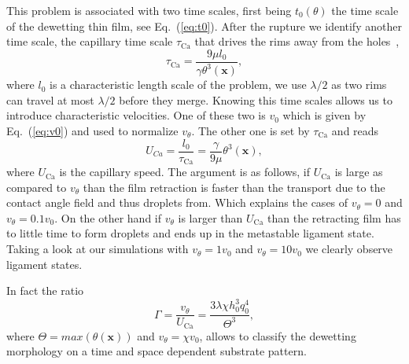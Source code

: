 \documentclass[twocolumn,amsmath,amssymb,showpacs,pre,nofootinbib,superscriptaddress]{revtex4-1} %
\begin{document}
This problem is associated with two time scales, first being $t_0(\theta)$ the time scale of the dewetting thin film, see Eq.~(\ref{eq:t0}).
After the rupture we identify another time scale, the capillary time scale $\tau_{\text{Ca}}$ that drives the rims away from the holes~\cite{Edwardse1600183},
\begin{equation}\label{eq:cap_time}
    \tau_{\text{Ca}} = \frac{9\mu l_0}{\gamma \theta^3(\mathbf{x})},
\end{equation}
where  $l_0$ is a characteristic length scale of the problem, we use $\lambda/2$ as two rims can travel at most $\lambda/2$ before they merge.
Knowing this time scales allows us to introduce characteristic velocities.
One of these two is $v_0$ which is given by Eq.~(\ref{eq:v0}) and used to normalize $v_{\theta}$.
The other one is set by $\tau_{\text{Ca}}$ and reads
\begin{equation}\label{eq:cap_speed}
    U_{Ca} =\frac{l_0}{\tau_{\text{Ca}}} = \frac{\gamma}{9\mu} \theta^3(\mathbf{x}), 
\end{equation}
where $U_{\text{Ca}}$ is the capillary speed.
The argument is as follows, if $U_{\text{Ca}}$ is large as compared to $v_{\theta}$ than the film retraction is faster than the transport due to the contact angle field and thus droplets from.
Which explains the cases of $v_{\theta} = 0$ and  $v_{\theta} = 0.1v_0$.
On the other hand if $v_{\theta}$ is larger than $U_{\text{Ca}}$ than the retracting film has to little time to form droplets and ends up in the metastable ligament state.
Taking a look at our simulations with $v_{\theta} = 1v_0$ and $v_{\theta} =  10v_0$ we clearly observe ligament states.

In fact the ratio 
\begin{equation}\label{eq:vel_ratio}
    \Gamma = \frac{v_{\theta}}{U_{\text{Ca}}} = \frac{3\lambda \chi h_0^3 q_0^4}{\Theta^3}, 
\end{equation}
where $\Theta = max(\theta(\mathbf{x}))$ and $v_{\theta} = \chi v_0$, allows to classify the dewetting morphology on a time and space dependent substrate pattern. 
\end{document}
